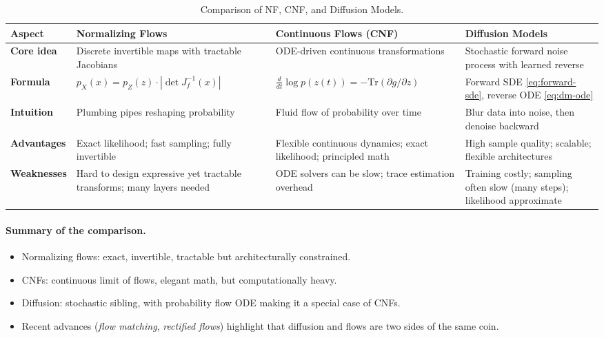 \documentclass[11pt]{article}
\theoremstyle{remark}
\begin{document}
\begin{table}[h!]
\centering
\renewcommand{\arraystretch}{1.3}
\small
\begin{tabularx}{\textwidth}{@{}p{2.1cm} >{\raggedright\arraybackslash}X >{\raggedright\arraybackslash}X >{\raggedright\arraybackslash}X@{}}
\toprule
\textbf{Aspect} & \textbf{Normalizing Flows} & \textbf{Continuous Flows (CNF)} & \textbf{Diffusion Models} \\
\midrule
\textbf{Core idea}
& Discrete invertible maps with tractable Jacobians
& ODE-driven continuous transformations
& Stochastic forward noise process with learned reverse \\
\textbf{Formula}
& $p_X(x)=p_Z(z)\cdot|\det J_{f}^{-1}(x)|$
& $\tfrac{d}{dt}\log p(z(t)) = -\mathrm{Tr}\!\left(\partial g/\partial z\right)$
& Forward SDE \eqref{eq:forward-sde}, reverse ODE \eqref{eq:dm-ode} \\
\textbf{Intuition}
& Plumbing pipes reshaping probability
& Fluid flow of probability over time
& Blur data into noise, then denoise backward \\
\textbf{Advantages}
& Exact likelihood; fast sampling; fully invertible
& Flexible continuous dynamics; exact likelihood; principled math
& High sample quality; scalable; flexible architectures \\
\textbf{Weaknesses}
& Hard to design expressive yet tractable transforms; many layers needed
& ODE solvers can be slow; trace estimation overhead
& Training costly; sampling often slow (many steps); likelihood approximate \\
\bottomrule
\end{tabularx}
\caption{Comparison of NF, CNF, and Diffusion Models.}
\end{table}

\paragraph{Summary of the comparison.}
\begin{itemize}[leftmargin=1.5em]
\item Normalizing flows: exact, invertible, tractable but architecturally constrained.
\item CNFs: continuous limit of flows, elegant math, but computationally heavy.
\item Diffusion: stochastic sibling, with probability flow ODE making it a special case of CNFs.
\item Recent advances (\emph{flow matching}, \emph{rectified flows}) highlight that diffusion and flows are two sides of the same coin.
\end{itemize}
\end{document}
